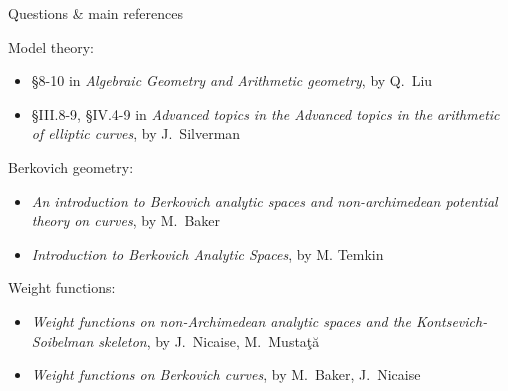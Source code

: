 \begin{frame}
	{Questions \& main references}



	
	Model theory:
	\begin{itemize}
		\item \S 8-10 in \emph{Algebraic Geometry and Arithmetic geometry}, by {Q.\ Liu}
		\item \S III.8-9, \S IV.4-9 in \emph{Advanced topics in the Advanced topics in the arithmetic of elliptic curves}, by {J.\ Silverman}
	\end{itemize}

	Berkovich geometry:
	\begin{itemize}
		\item \emph{An introduction to Berkovich analytic spaces and non-archimedean potential theory on curves}, by  {M.\ Baker}
		\item \emph{Introduction to Berkovich Analytic Spaces}, by {M. Temkin}
	\end{itemize}

	Weight functions:
	\begin{itemize}
		\item \emph{Weight functions on non-Archimedean analytic spaces and the Kontsevich-Soibelman skeleton}, by {J.\ Nicaise, M.\ Mustaţă}
		\item \emph{Weight functions on Berkovich curves}, by {M.\ Baker, J.\ Nicaise}
	\end{itemize}
\end{frame}
